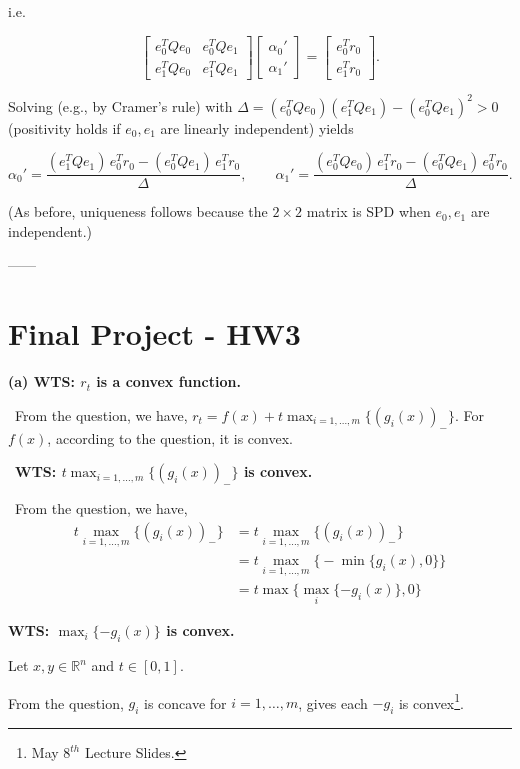 \documentclass[12pt]{article}
\begin{document}
i.e.

$$
\begin{bmatrix}
e_0^TQe_0 & e_0^TQe_1\\
e_1^TQe_0 & e_1^TQe_1
\end{bmatrix}
\begin{bmatrix}\alpha_0'\\ \alpha_1'\end{bmatrix}
=
\begin{bmatrix} e_0^T r_0\\ e_1^T r_0\end{bmatrix}.
$$

Solving (e.g., by Cramer’s rule) with
$\displaystyle \Delta=(e_0^TQe_0)(e_1^TQe_1)-(e_0^TQe_1)^2>0$ (positivity holds if $e_0,e_1$ are linearly independent) yields

$$
\boxed{
\alpha_0'
=\frac{(e_1^TQe_1)\,e_0^Tr_0-(e_0^TQe_1)\,e_1^Tr_0}{\Delta},
\qquad
\alpha_1'
=\frac{(e_0^TQe_0)\,e_1^Tr_0-(e_0^TQe_1)\,e_0^Tr_0}{\Delta}.
}
$$

(As before, uniqueness follows because the $2\times2$ matrix is SPD when $e_0,e_1$ are independent.)



------

\newpage

\section{Final Project - HW3}
\textbf{(a) WTS: $r_t$ is a convex function.}

\ From the question, we have, $r_t = f(x)+t\max_{i=1,\dots,m}\{(g_i(x))_-\}$.  For $f(x)$, according to the question, it is convex.

\ \quad  \textbf{WTS: $\displaystyle t\max_{i=1,\dots,m}\{(g_i(x))_-\}$ is convex.}

\ \quad From the question, we have, 
\begin{align*}
	t\max_{i=1,\dots,m}\{(g_i(x))_-\} &= t\max_{i=1,\dots,m}\{(g_i(x))_-\} \\
	&= t\max_{i=1,\dots,m}\bigl\{-\min \{g_i(x), 0 \}\bigr\} \\
	&= t\max\bigl\{\max_{i}\{-g_i(x)\}, 0\bigr\}
\end{align*}

\quad \qquad \textbf{WTS: $\max_{i}\{-g_i(x)\}$ is convex.}

\quad \qquad Let $x,y \in \mathbb{R}^n$ and $t \in [0,1]$. 

\quad \qquad From the question, $g_i$ is concave for $i=1,\dots,m$, gives each $-g_i$ is convex\footnote{May $8^{th}$ Lecture Slides.}.
\end{document}
